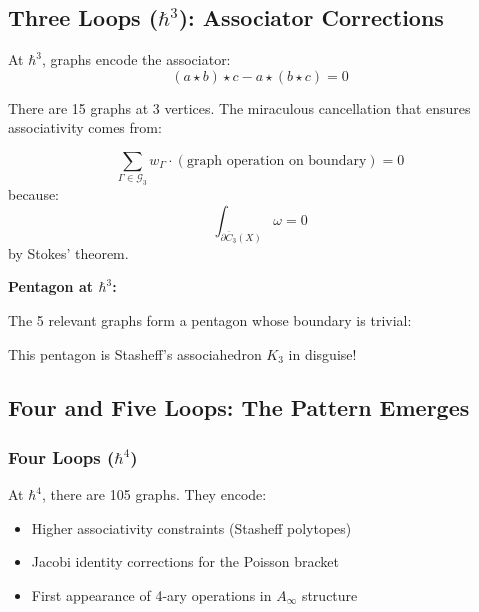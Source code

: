 \subsection{Three Loops ($\hbar^3$): Associator Corrections}

At $\hbar^3$, graphs encode the associator:
$$(a \star b) \star c - a \star (b \star c) = 0$$

There are 15 graphs at 3 vertices. The miraculous cancellation that ensures associativity comes from:

\begin{theorem}
$$\sum_{\Gamma \in \mathcal{G}_3} w_\Gamma \cdot (\text{graph operation on boundary}) = 0$$
because:
$$\int_{\partial \overline{C}_3(X)} \omega = 0$$
by Stokes' theorem.
\end{theorem}

\textbf{Pentagon at $\hbar^3$:}

The 5 relevant graphs form a pentagon whose boundary is trivial:
\begin{center}
\end{center}

This pentagon is Stasheff's associahedron $K_3$ in disguise!

\subsection{Four and Five Loops: The Pattern Emerges}

\subsubsection{Four Loops ($\hbar^4$)}

At $\hbar^4$, there are 105 graphs. They encode:
\begin{itemize}
\item Higher associativity constraints (Stasheff polytopes)
\item Jacobi identity corrections for the Poisson bracket
\item First appearance of 4-ary operations in $A_\infty$ structure
\end{itemize}

